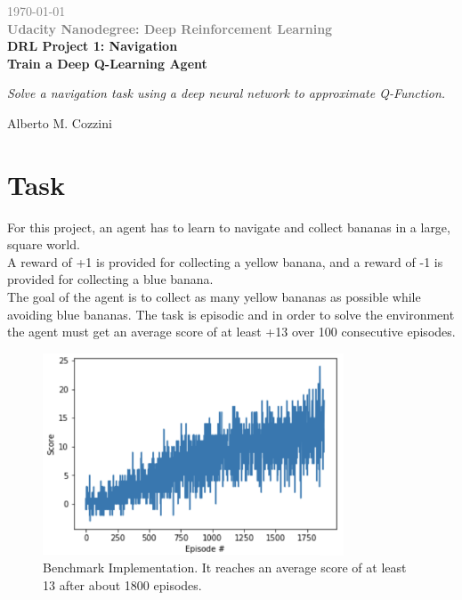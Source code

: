 \documentclass[pagenumber=off]{article}
\begin{document}
\begin{titlepage}
\begin{center}
\vspace{1cm}
{\textcolor{gray}\today}\\
{\textcolor{gray}{\bf Udacity Nanodegree: Deep Reinforcement Learning }}\\
\vspace{1.5cm}
{\textcolor{coolblack}{\huge \bf DRL Project 1: Navigation}}\\
\vspace{0.5cm}
{\textcolor{coolblack}{\Large \bf  Train a Deep Q-Learning Agent}}
\par
\vspace{0.5cm}
{\textcolor{coolblack}{\Large\itshape Solve a navigation task using a deep neural network to approximate Q-Function.}}\par
\vspace{6cm}
\end{center}
\tableofcontents

\vspace{6cm}

\begin{center}
{Alberto M. Cozzini}\\
\end{center}
\end{titlepage}

\section{Task}
For this project, an agent has to learn to navigate and collect bananas in a large, square world.\\
A reward of +1 is provided for collecting a yellow banana, and a reward of -1 is provided for collecting a blue banana.\\
The goal of the agent is to collect as many yellow bananas as possible while avoiding blue bananas. The task is episodic and in order to solve the environment the agent must get an average score of at least +13 over 100 consecutive episodes.


\begin{figure}[!h]
  \centerline{\includegraphics[page=1, height=6cm, width=12 cm, angle=0]{./Benchmark_Score.png}}
  \caption{Benchmark Implementation. It reaches an average score of at least 13 after about 1800 episodes.}
\end{figure}
\end{document}
